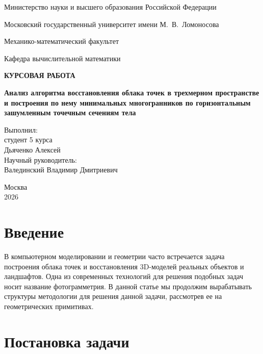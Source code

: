 \documentclass[12pt, a4paper]{article}
\begin{document}
\begin{titlepage}
\centering
{\small Министерство науки и высшего образования Российской Федерации\par}
{\small Московский государственный университет имени М.~В.~Ломоносова\par}
{\small Механико-математический факультет\par}
{\small Кафедра вычислительной математики\par}
\vspace{2.2cm}
{\Large\bfseries КУРСОВАЯ РАБОТА\par}
\vspace{0.9cm}
{\large\bfseries Анализ алгоритма восстановления облака точек в трехмерном пространстве и построения по нему минимальных многогранников по горизонтальным зашумленным точечным сечениям тела\par}
\vfill
\begin{flushright}
\begin{minipage}{0.55\textwidth}
Выполнил:\\
студент 5 курса\\
Дьяченко Алексей\\[0.7em]
Научный руководитель:\\
Валединский Владимир Дмитриевич
\end{minipage}
\end{flushright}
\vfill
{\small Москва\\2026\par}
\thispagestyle{empty}
\end{titlepage}
\setcounter{page}{2}

\tableofcontents
\clearpage

\section{Введение}

В компьютерном моделировании и геометрии часто встречается задача построения облака точек и восстановления 3D-моделей реальных объектов и ландшафтов. Одна из современных технологий для решения подобных задач носит название фотограмметрия. В данной статье мы продолжим вырабатывать структуры методологии для решения данной задачи, рассмотрев ее на геометрических примитивах.

\clearpage
\section{Постановка задачи}
\end{document}
